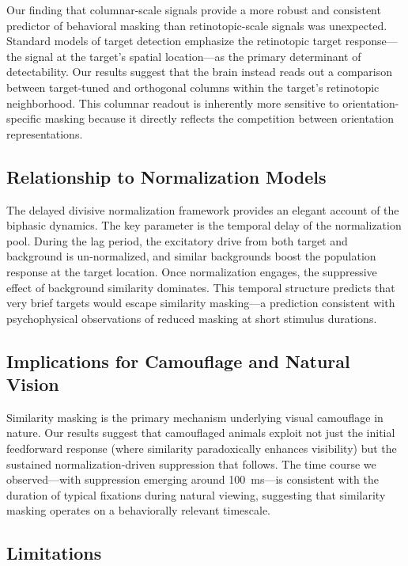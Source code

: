 \documentclass[11pt]{article}
\begin{document}
Our finding that columnar-scale signals provide a more robust and consistent predictor of behavioral masking than retinotopic-scale signals was unexpected. Standard models of target detection emphasize the retinotopic target response---the signal at the target's spatial location---as the primary determinant of detectability. Our results suggest that the brain instead reads out a comparison between target-tuned and orthogonal columns within the target's retinotopic neighborhood. This columnar readout is inherently more sensitive to orientation-specific masking because it directly reflects the competition between orientation representations.

\subsection{Relationship to Normalization Models}

The delayed divisive normalization framework \citep{reynoldsheeger2009,schwartz2001} provides an elegant account of the biphasic dynamics. The key parameter is the temporal delay of the normalization pool. During the lag period, the excitatory drive from both target and background is un-normalized, and similar backgrounds boost the population response at the target location. Once normalization engages, the suppressive effect of background similarity dominates. This temporal structure predicts that very brief targets would escape similarity masking---a prediction consistent with psychophysical observations of reduced masking at short stimulus durations.

\subsection{Implications for Camouflage and Natural Vision}

Similarity masking is the primary mechanism underlying visual camouflage in nature. Our results suggest that camouflaged animals exploit not just the initial feedforward response (where similarity paradoxically enhances visibility) but the sustained normalization-driven suppression that follows. The time course we observed---with suppression emerging around 100~ms---is consistent with the duration of typical fixations during natural viewing, suggesting that similarity masking operates on a behaviorally relevant timescale.

\subsection{Limitations}
\end{document}
